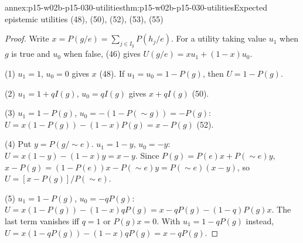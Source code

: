 \begin{annexitem}{annex:p15-w02b-p15-030-utilities}{thm:p15-w02b-p15-030-utilities}{Expected epistemic utilities (48), (50), (52), (53), (55)}
\begin{proof}
Write \(x=P(g/e)=\sum_{j\in I_g}P(h_j/e)\). For a utility taking value
\(u_1\) when \(g\) is true and \(u_0\) when false, (46) gives
\(U(g/e)=xu_1+(1-x)u_0\).

(1) \(u_1=1\), \(u_0=0\) gives \(x\) (48). If \(u_1=u_0=1-P(g)\), then
\(U=1-P(g)\).

(2) \(u_1=1+qI(g)\), \(u_0=qI(g)\) gives \(x+qI(g)\) (50).

(3) \(u_1=1-P(g)\), \(u_0=-(1-P(\sim g))=-P(g)\):
\(U=x(1-P(g))-(1-x)P(g)=x-P(g)\) (52).

(4) Put \(y=P(g/\sim e)\). \(u_1=1-y\), \(u_0=-y\):
\(U=x(1-y)-(1-x)y=x-y\). Since \(P(g)=P(e)x+P(\sim e)y\),
\(x-P(g)=(1-P(e))x-P(\sim e)y=P(\sim e)(x-y)\), so
\(U=[x-P(g)]/P(\sim e)\).

(5) \(u_1=1-P(g)\), \(u_0=-qP(g)\):
\(U=x(1-P(g))-(1-x)qP(g)=x-qP(g)-(1-q)P(g)x\). The last term vanishes iff
\(q=1\) or \(P(g)x=0\). With \(u_1=1-qP(g)\) instead,
\(U=x(1-qP(g))-(1-x)qP(g)=x-qP(g)\).
\end{proof}
\end{annexitem}

